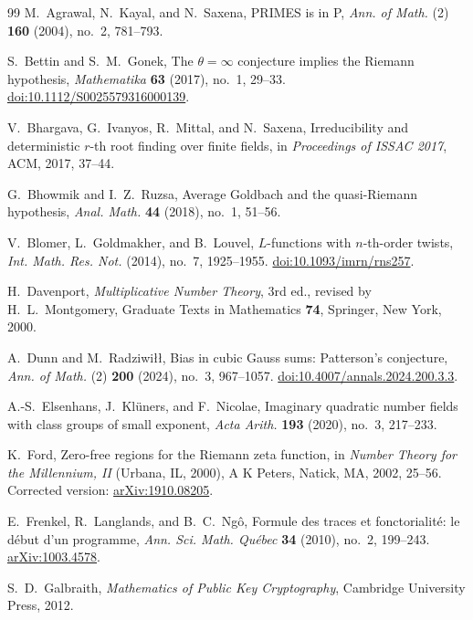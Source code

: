 \documentclass[11pt,a4paper]{article}
\numberwithin{equation}{section}
\numberwithin{figure}{section}
\theoremstyle{definition}
\theoremstyle{remark}
\begin{document}
\begin{thebibliography}{99}
M.~Agrawal, N.~Kayal, and N.~Saxena,
PRIMES is in P,
\emph{Ann. of Math.} (2) \textbf{160} (2004), no.~2, 781--793.

S.~Bettin and S.~M.~Gonek,
The $\theta=\infty$ conjecture implies the Riemann hypothesis,
\emph{Mathematika} \textbf{63} (2017), no.~1, 29--33.
\href{https://doi.org/10.1112/S0025579316000139}
{doi:10.1112/S0025579316000139}.

V.~Bhargava, G.~Ivanyos, R.~Mittal, and N.~Saxena,
Irreducibility and deterministic $r$-th root finding over finite fields,
in \emph{Proceedings of ISSAC 2017}, ACM, 2017, 37--44.

G.~Bhowmik and I.~Z.~Ruzsa,
Average Goldbach and the quasi-Riemann hypothesis,
\emph{Anal. Math.} \textbf{44} (2018), no.~1, 51--56.

V.~Blomer, L.~Goldmakher, and B.~Louvel,
$L$-functions with $n$-th-order twists,
\emph{Int. Math. Res. Not.} (2014), no.~7, 1925--1955.
\href{https://doi.org/10.1093/imrn/rns257}
{doi:10.1093/imrn/rns257}.

H.~Davenport,
\emph{Multiplicative Number Theory}, 3rd ed., revised by
H.~L.~Montgomery, Graduate Texts in Mathematics \textbf{74},
Springer, New York, 2000.

A.~Dunn and M.~Radziwi\l\l,
Bias in cubic Gauss sums: Patterson's conjecture,
\emph{Ann. of Math.} (2) \textbf{200} (2024), no.~3, 967--1057.
\href{https://doi.org/10.4007/annals.2024.200.3.3}
{doi:10.4007/annals.2024.200.3.3}.

A.-S.~Elsenhans, J.~Kl\"uners, and F.~Nicolae,
Imaginary quadratic number fields with class groups of small exponent,
\emph{Acta Arith.} \textbf{193} (2020), no.~3, 217--233.

K.~Ford,
Zero-free regions for the Riemann zeta function,
in \emph{Number Theory for the Millennium, II} (Urbana, IL, 2000),
A K Peters, Natick, MA, 2002, 25--56.
Corrected version: \href{https://arxiv.org/abs/1910.08205}
{arXiv:1910.08205}.

E.~Frenkel, R.~Langlands, and B.~C.~Ng\^o,
Formule des traces et fonctorialit\'e: le d\'ebut d'un programme,
\emph{Ann. Sci. Math. Qu\'ebec} \textbf{34} (2010), no.~2, 199--243.
\href{https://arxiv.org/abs/1003.4578}{arXiv:1003.4578}.

S.~D.~Galbraith,
\emph{Mathematics of Public Key Cryptography},
Cambridge University Press, 2012.


\end{thebibliography}
\end{document}
